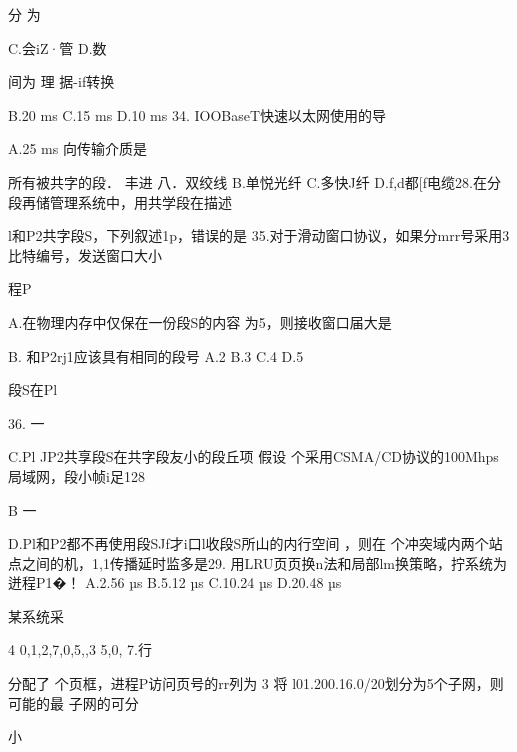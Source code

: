     分  为

    C.会iZ·管    D.数

   间为    理    据-if转换

    B.20 ms    C.15 ms    D.10 ms    34. IOOBaseT快速以太网使用的导

   A.25 ms    向传输介质是

    所有被共字的段． 丰进    八．双绞线    B.单悦光纤    C.多快J纤   D.f,d都[f电缆28.在分段再储管理系统中，用共学段在描述

    l和P2共字段S，下列叙述1p，错误的是    35.对于滑动窗口协议，如果分mrr号采用3 比特编号，发送窗口大小

   程P

   A.在物理内存中仅保在一份段S的内容    为5，则接收窗口届大是

   B.    和P2rj1应该具有相同的段号    A.2    B.3    C.4    D.5

    段S在Pl

    36.    一

   C.Pl JP2共享段S在共字段友小的段丘项    假设  个采用CSMA/CD协议的100Mhps局域网，段小帧i足128

    B    一

   D.Pl和P2都不再使用段SJf才i口l收段S所山的内行空间    ，则在  个冲突域内两个站点之间的机，1,1传播延时监多是29.    用LRU页页换n法和局部lm换策略，拧系统为迸程P1�！    A.2.56 µs    B.5.12 µs    C.10.24 µs   D.20.48 µs

   某系统采

    4    0,1,2,7,0,5,,3 5,0,    7.行

   分配了  个页框，进程P访问页号的rr列为    3    将 l01.200.16.0/20划分为5个子网，则可能的最  子网的可分

    小

